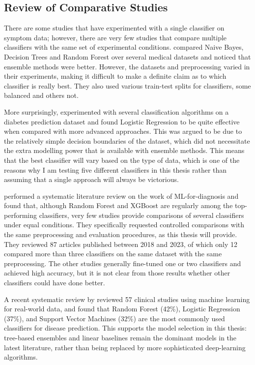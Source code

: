 \subsection{Review of Comparative Studies}

There are some studies that have experimented with a single classifier on symptom data; however, there are very few studies that compare multiple classifiers with the same set of experimental conditions. \citet{Uddin2019} compared Naive Bayes, Decision Trees and Random Forest over several medical datasets and noticed that ensemble methods were better. However, the datasets and preprocessing varied in their experiments, making it difficult to make a definite claim as to which classifier is really best. They also used various train-test splits for classifiers, some balanced and others not.

More surprisingly, \citet{Sarker2021} experimented with several classification algorithms on a diabetes prediction dataset and found Logistic Regression to be quite effective when compared with more advanced approaches. This was argued to be due to the relatively simple decision boundaries of the dataset, which did not necessitate the extra modelling power that is available with ensemble methods. This means that the best classifier will vary based on the type of data, which is one of the reasons why I am testing five different classifiers in this thesis rather than assuming that a single approach will always be victorious.

\citet{Chowdhury2024} performed a systematic literature review on the work of ML-for-diagnosis and found that, although Random Forest and XGBoost are regularly among the top-performing classifiers, very few studies provide comparisons of several classifiers under equal conditions. They specifically requested controlled comparisons with the same preprocessing and evaluation procedures, as this thesis will provide. They reviewed 87 articles published between 2018 and 2023, of which only 12 compared more than three classifiers on the same dataset with the same preprocessing. The other studies generally fine-tuned one or two classifiers and achieved high accuracy, but it is not clear from those results whether other classifiers could have done better.

A recent systematic review by \citet{Alhumaidi2025} reviewed 57 clinical studies using machine learning for real-world data, and found that Random Forest (42\%), Logistic Regression (37\%), and Support Vector Machines (32\%) are the most commonly used classifiers for disease prediction. This supports the model selection in this thesis: tree-based ensembles and linear baselines remain the dominant models in the latest literature, rather than being replaced by more sophisticated deep-learning algorithms.


